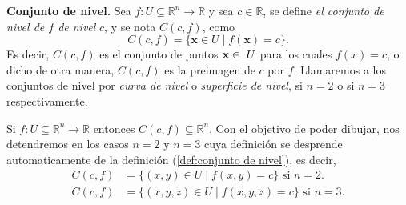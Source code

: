     
    





\begin{definition} \textbf{Conjunto de nivel.} 
    \label{def:conjunto de nivel}     
    Sea $f: U  \subseteq  \mathbb{R}^n \rightarrow \mathbb{R}$ y sea $c \in \mathbb{R}$, se define  \emph{el conjunto de nivel de $f$ de nivel}  $c$, y se nota $C(c,f)$,  como  
    \[
    C(c,f)=\{ \mathbf{x} \in U \;|\; f (\mathbf{x})=c \}.
     \]
 Es decir,  $C(c,f)$ es el conjunto de puntos $\vect{x}\in\ U$ para los cuales $f(x)=c$, o dicho de otra manera,  $C(c,f)$ es la preimagen de $c$ por $f$.   Llamaremos a los conjuntos de nivel por \emph{ curva de nivel}  o   \emph{superficie de nivel}, si $n=2$ o si $n=3$ respectivamente.   
\end{definition}


\begin{obs}  Si $f: U \subseteq \mathbb{R}^n \rightarrow \mathbb{R}$ entonces $C(c,f)   \subseteq  \mathbb{R}^{n}.$   Con el objetivo de poder dibujar,  nos detendremos en los casos $n=2$ y $n=3$  cuya definici\'on se desprende automaticamente  de la definici\'on  (\ref{def:conjunto de nivel}), es decir, 
 \begin{align}\label{def:conjunto de nive perticular} 
    C(c,f)&=\{ (x,y) \in U \;|\; f (x,y)=c \} \mbox{ si } n=2. \\
     C(c,f)&=\{ (x,y,z) \in U \;|\; f (x,y,z)=c \} \mbox{ si } n=3.
  \end{align} 
\end{obs}


